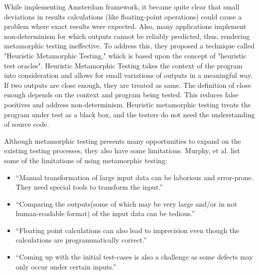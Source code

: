 While implementing Amsterdam framework, it became quite clear that small deviations in results calculations (like floating-point operations) could cause a problem where exact results were expected. Also, many applications implement non-determinism for which outputs cannot be reliably predicted, thus, rendering metamorphic testing ineffective. To address this, they proposed a technique called "Heuristic Metamorphic Testing," which is based upon the concept of "heuristic test oracles". 
Heuristic Metamorphic Testing takes the context of the program into consideration and allows for small variations of outputs in a meaningful way. If two outputs are close enough, they are treated as same. The definition of close enough depends on the context and program being tested. This reduces false positives and address non-determinism. Heuristic metamorphic testing treats the program under test as a black box, and the testers do not need the understanding of source code.
		
Although metamorphic testing presents many opportunities to expand on the existing testing processes, they also have some limitations. Murphy, et al. \cite{Murphy2009} list some of the limitations of using metamorphic testing:
\begin{itemize}
	\item \enquote{Manual transformation of large input data can be laborious and error-prone. They need special tools to transform the input.}
	\item \enquote{Comparing the outputs(some of which may be very large and/or in not human-readable format) of the input data can be tedious.}
	\item \enquote{Floating point calculations can also lead to imprecision even though the calculations are programmatically correct.}
	\item \enquote{Coming up with the initial test-cases is also a challenge as some defects may only occur under certain inputs.}
\end{itemize}

